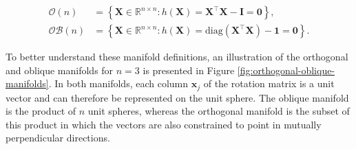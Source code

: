 \documentclass[
  12pt,
  letterpaper,
  article]{scrartcl}
\begin{document}
\[
\begin{aligned}
\mathcal{O}(n) &= \left\{ \mathbf{X}\in\mathbb{R}^{n\times n}: h(\mathbf{X}) = \mathbf{X}^\top\mathbf{X}-\mathbf{I} = \mathbf{0} \right\}, \\
\mathcal{OB}(n) &= \left\{ \mathbf{X}\in\mathbb{R}^{n\times n}: h(\mathbf{X}) = \mathrm{diag}(\mathbf{X}^\top\mathbf{X})-\mathbf{1} = \mathbf{0} \right\}.
\end{aligned}
\]

To better understand these manifold definitions, an illustration of the
orthogonal and oblique manifolds for \(n=3\) is presented in Figure
\ref{fig:orthogonal-oblique-manifolds}. In both manifolds, each column
\(\mathbf{x}_j\) of the rotation matrix is a unit vector and can
therefore be represented on the unit sphere. The oblique manifold is the
product of \(n\) unit spheres, whereas the orthogonal manifold is the
subset of this product in which the vectors are also constrained to
point in mutually perpendicular directions.
\end{document}

